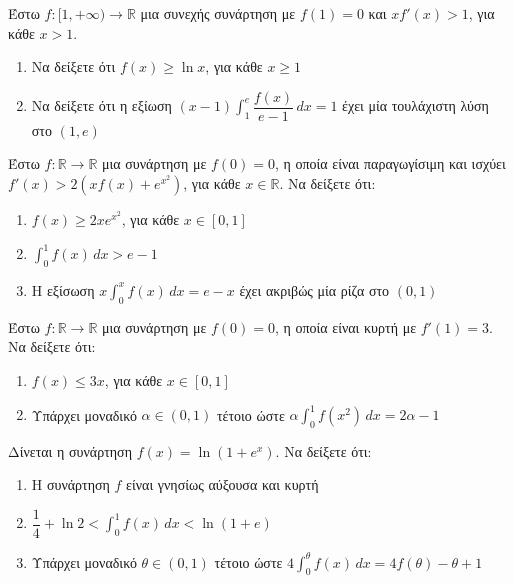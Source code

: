 \documentclass{../presentation}
\begin{document}
\begin{askisi}
  Έστω $f:[1,+\infty)\to \mathbb{R}$ μια συνεχής συνάρτηση με $f(1)=0$ και $xf'(x)>1$, για κάθε $x>1$.
  \begin{enumerate}[<+->]
    \item Να δείξετε ότι $f(x)\ge \ln x$, για κάθε $x\ge 1$
    \item Να δείξετε ότι η εξίωση $(x-1)\int_{1}^{e}\dfrac{f(x)}{e-1}\, dx=1$ έχει μία τουλάχιστη λύση στο $(1,e)$
  \end{enumerate}
\end{askisi}

\begin{askisi}
  Έστω $f:\mathbb{R}\to \mathbb{R}$ μια συνάρτηση με $f(0)=0$, η οποία είναι παραγωγίσιμη και ισχύει $f'(x)>2 \left( xf(x)+e^{x^2} \right)$, για κάθε $x\in \mathbb{R}$. Να δείξετε ότι:
  \begin{enumerate}[<+->]
    \item $f(x)\ge 2xe^{x^2}$, για κάθε $x\in [0,1]$
    \item $\int_{0}^{1}f(x)\, dx>e-1$
    \item Η εξίσωση $x\int_{0}^{x}f(x)\, dx=e-x$ έχει ακριβώς μία ρίζα στο $(0,1)$
  \end{enumerate}
\end{askisi}

\begin{askisi}
  Έστω $f:\mathbb{R}\to \mathbb{R}$ μια συνάρτηση με $f(0)=0$, η οποία είναι κυρτή με $f'(1)=3$. Να δείξετε ότι:
  \begin{enumerate}[<+->]
    \item $f(x)\le 3x$, για κάθε $x\in [0,1]$
    \item Υπάρχει μοναδικό $α\in (0,1)$ τέτοιο ώστε $α\int_{0}^{1}f(x^2)\, dx=2α-1$
  \end{enumerate}
\end{askisi}

\begin{askisi}
  Δίνεται η συνάρτηση $f(x)=\ln (1+e^x)$. Να δείξετε ότι:
  \begin{enumerate}[<+->]
    \item Η συνάρτηση $f$ είναι γνησίως αύξουσα και κυρτή
    \item $\dfrac{1}{4}+\ln 2<\int_{0}^{1}f(x)\, dx<\ln (1+e)$
    \item Υπάρχει μοναδικό $θ\in (0,1)$ τέτοιο ώστε $4\int_{0}^{θ}f(x)\, dx=4f(θ)-θ+1$
  \end{enumerate}
\end{askisi}
\end{document}
